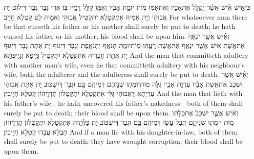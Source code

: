 {כִּֽי\maqqaf אִ֣ישׁ אִ֗ישׁ אֲשֶׁ֨ר יְקַלֵּ֧ל אֶת\maqqaf אָבִ֛יו וְאֶת\maqqaf אִמּ֖וֹ מ֣וֹת יוּמָ֑ת אָבִ֧יו וְאִמּ֛וֹ קִלֵּ֖ל דָּמָ֥יו בּֽוֹ׃}
{אֲרֵי גְּבַר גְּבַר דִּילוּט יָת אֲבוּהִי וְיָת אִמֵּיהּ אִתְקְטָלָא יִתְקְטִיל אֲבוּהִי וְאִמֵּיהּ לָט קַטְלָא חַיָּיב׃}
{For whatsoever man there be that curseth his father or his mother shall surely be put to death; he hath cursed his father or his mother; his blood shall be upon him.}{}
{וְאִ֗ישׁ אֲשֶׁ֤ר יִנְאַף֙ אֶת\maqqaf אֵ֣שֶׁת אִ֔ישׁ אֲשֶׁ֥ר יִנְאַ֖ף אֶת\maqqaf אֵ֣שֶׁת רֵעֵ֑הוּ מֽוֹת\maqqaf יוּמַ֥ת הַנֹּאֵ֖ף וְהַנֹּאָֽפֶת׃}
{וּגְבַר דִּיגוּף יָת אִתַּת גְּבַר דִּיגוּף יָת אִתַּת חַבְרֵיהּ אִתְקְטָלָא יִתְקְטִיל גַּיָּיפָא וְגַיָּיפְתָא׃}
{And the man that committeth adultery with another man’s wife, even he that committeth adultery with his neighbour’s wife, both the adulterer and the adulteress shall surely be put to death.}{}
{וְאִ֗ישׁ אֲשֶׁ֤ר יִשְׁכַּב֙ אֶת\maqqaf אֵ֣שֶׁת אָבִ֔יו עֶרְוַ֥ת אָבִ֖יו גִּלָּ֑ה מֽוֹת\maqqaf יוּמְת֥וּ שְׁנֵיהֶ֖ם דְּמֵיהֶ֥ם בָּֽם׃}
{וּגְבַר דְּיִשְׁכּוֹב יָת אִתַּת אֲבוּהִי עֶרְיְתָא דַּאֲבוּהִי גַּלִּי אִתְקְטָלָא יִתְקַטְלוּן תַּרְוֵיהוֹן קַטְלָא חַיָּיבִין׃}
{And the man that lieth with his father’s wife—he hath uncovered his father’s nakedness—both of them shall surely be put to death; their blood shall be upon them.}{}
{וְאִ֗ישׁ אֲשֶׁ֤ר יִשְׁכַּב֙ אֶת\maqqaf כַּלָּת֔וֹ מ֥וֹת יוּמְת֖וּ שְׁנֵיהֶ֑ם תֶּ֥בֶל עָשׂ֖וּ דְּמֵיהֶ֥ם בָּֽם׃}
{וּגְבַר דְּיִשְׁכּוֹב יָת כַּלְּתֵיהּ אִתְקְטָלָא יִתְקַטְלוּן תַּרְוֵיהוֹן תָּבְלָא עֲבַדוּ קַטְלָא חַיָּיבִין׃}
{And if a man lie with his daughter-in-law, both of them shall surely be put to death; they have wrought corruption; their blood shall be upon them.}{}
